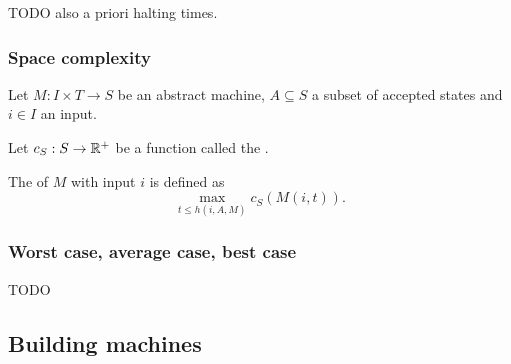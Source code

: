 TODO also a priori halting times.

\subsubsection{Space complexity}
\begin{definition}
Let  $M: I\times T \to S$ be an abstract machine, $A \subseteq S$ a subset of accepted states and $i\in I$ an input.

Let $c_S: S\to \mathbb{R}^+$ be a function called the .

The  of $M$ with input $i$ is defined as
\[ \max_{t\leq h(i,A,M)} c_S(M(i,t)). \]
\end{definition}

\subsubsection{Worst case, average case, best case}
TODO

\subsection{Building machines}
